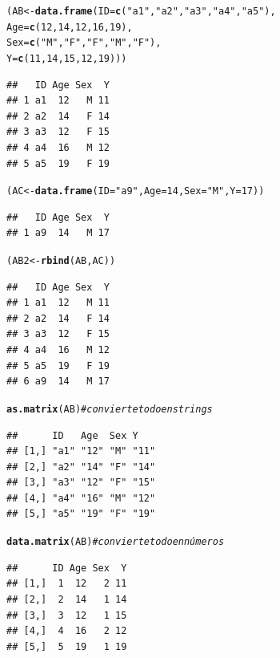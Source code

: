 \documentclass{config/apuntes}\usepackage[]{graphicx}\usepackage[]{xcolor}
\makeatletter
\newcommand{\hlnum}[1]{\textcolor[rgb]{0.686,0.059,0.569}{#1}}%
\newcommand{\hlsng}[1]{\textcolor[rgb]{0.192,0.494,0.8}{#1}}%
\newcommand{\hlcom}[1]{\textcolor[rgb]{0.678,0.584,0.686}{\textit{#1}}}%
\newcommand{\hldef}[1]{\textcolor[rgb]{0.345,0.345,0.345}{#1}}%
\newcommand{\hlkwb}[1]{\textcolor[rgb]{0.69,0.353,0.396}{#1}}%
\newcommand{\hlkwc}[1]{\textcolor[rgb]{0.333,0.667,0.333}{#1}}%
\newcommand{\hlkwd}[1]{\textcolor[rgb]{0.737,0.353,0.396}{\textbf{#1}}}%
\newenvironment{kframe}{%
 \def\at@end@of@kframe{}%
 \ifinner\ifhmode%
  \def\at@end@of@kframe{\end{minipage}}%
  \begin{minipage}{\columnwidth}%
 \fi\fi%
 \def\FrameCommand##1{\hskip\@totalleftmargin \hskip-\fboxsep
 \colorbox{shadecolor}{##1}\hskip-\fboxsep
     \hskip-\linewidth \hskip-\@totalleftmargin \hskip\columnwidth}%
 \MakeFramed {\advance\hsize-\width
   \@totalleftmargin\z@ \linewidth\hsize
   \@setminipage}}%
 {\par\unskip\endMakeFramed%
 \at@end@of@kframe}
\newenvironment{knitrout}{}{} %
\makeatother
\begin{document}
\begin{knitrout}
\color{fgcolor}\begin{kframe}
\begin{alltt}
\hldef{(AB} \hlkwb{<-} \hlkwd{data.frame}\hldef{(}\hlkwc{ID} \hldef{=} \hlkwd{c}\hldef{(}\hlsng{"a1"}\hldef{,} \hlsng{"a2"}\hldef{,} \hlsng{"a3"}\hldef{,} \hlsng{"a4"}\hldef{,} \hlsng{"a5"}\hldef{),}
                  \hlkwc{Age} \hldef{=} \hlkwd{c}\hldef{(}\hlnum{12}\hldef{,} \hlnum{14}\hldef{,} \hlnum{12}\hldef{,} \hlnum{16}\hldef{,} \hlnum{19}\hldef{),}
                  \hlkwc{Sex} \hldef{=} \hlkwd{c}\hldef{(}\hlsng{"M"}\hldef{,} \hlsng{"F"}\hldef{,} \hlsng{"F"}\hldef{,} \hlsng{"M"}\hldef{,} \hlsng{"F"}\hldef{),}
                  \hlkwc{Y} \hldef{=} \hlkwd{c}\hldef{(}\hlnum{11}\hldef{,} \hlnum{14}\hldef{,} \hlnum{15}\hldef{,} \hlnum{12}\hldef{,} \hlnum{19}\hldef{)))}
\end{alltt}
\begin{verbatim}
##   ID Age Sex  Y
## 1 a1  12   M 11
## 2 a2  14   F 14
## 3 a3  12   F 15
## 4 a4  16   M 12
## 5 a5  19   F 19
\end{verbatim}
\begin{alltt}
\hldef{(AC} \hlkwb{<-} \hlkwd{data.frame}\hldef{(}\hlkwc{ID} \hldef{=} \hlsng{"a9"}\hldef{,} \hlkwc{Age} \hldef{=} \hlnum{14}\hldef{,} \hlkwc{Sex} \hldef{=} \hlsng{"M"}\hldef{,} \hlkwc{Y} \hldef{=} \hlnum{17}\hldef{))}
\end{alltt}
\begin{verbatim}
##   ID Age Sex  Y
## 1 a9  14   M 17
\end{verbatim}
\begin{alltt}
\hldef{(AB2} \hlkwb{<-} \hlkwd{rbind}\hldef{(AB, AC))}
\end{alltt}
\begin{verbatim}
##   ID Age Sex  Y
## 1 a1  12   M 11
## 2 a2  14   F 14
## 3 a3  12   F 15
## 4 a4  16   M 12
## 5 a5  19   F 19
## 6 a9  14   M 17
\end{verbatim}
\begin{alltt}
\hlkwd{as.matrix}\hldef{(AB)} \hlcom{#convierte todo en strings}
\end{alltt}
\begin{verbatim}
##      ID   Age  Sex Y   
## [1,] "a1" "12" "M" "11"
## [2,] "a2" "14" "F" "14"
## [3,] "a3" "12" "F" "15"
## [4,] "a4" "16" "M" "12"
## [5,] "a5" "19" "F" "19"
\end{verbatim}
\begin{alltt}
\hlkwd{data.matrix}\hldef{(AB)} \hlcom{#convierte todo en números}
\end{alltt}
\begin{verbatim}
##      ID Age Sex  Y
## [1,]  1  12   2 11
## [2,]  2  14   1 14
## [3,]  3  12   1 15
## [4,]  4  16   2 12
## [5,]  5  19   1 19
\end{verbatim}
\end{kframe}
\end{knitrout}
\end{document}

